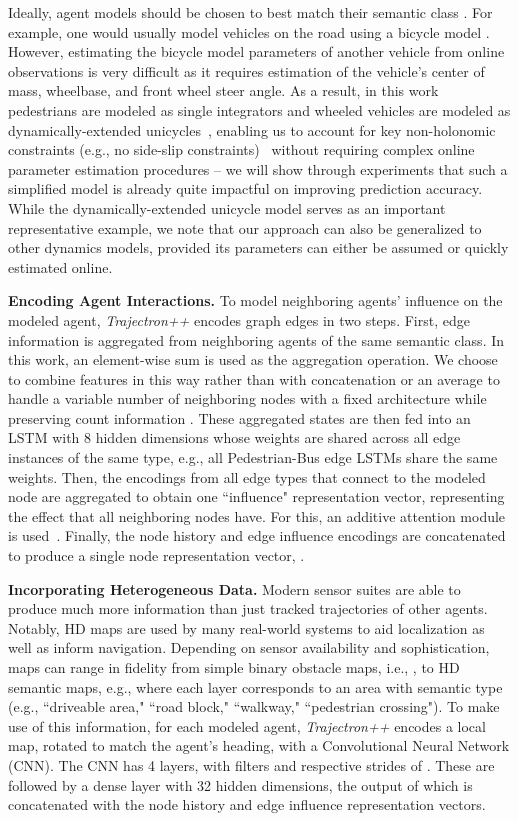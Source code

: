 \documentclass[runningheads]{llncs}
\newcommand{\algname}{\mbox{Trajectron++}}
\newcommand{\emphalgname}{\emph{\algname}}
\begin{document}
Ideally, agent models should be chosen to best match their semantic class . For example, one would usually model vehicles on the road using a bicycle model \cite{KongPfeiferEtAl2015,PadenCapEtAl2016}. However, estimating the bicycle model parameters of another vehicle from online observations is very difficult as it requires estimation of the vehicle's center of mass, wheelbase, and front wheel steer angle. As a result, in this work pedestrians are modeled as single integrators and wheeled vehicles are modeled as dynamically-extended unicycles~\cite{LaValle2006BetterUnicycle}, enabling us to account for key non-holonomic constraints (e.g., no side-slip constraints)~\cite{PadenCapEtAl2016} without requiring complex online parameter estimation procedures -- we will show through experiments that such a simplified model is already quite impactful on improving prediction accuracy.
While the dynamically-extended unicycle model serves as an important representative example, we note that our approach can also be generalized to other dynamics models, provided its parameters can either be assumed or quickly estimated online.


{\bf Encoding Agent Interactions.} To model neighboring agents' influence on the modeled agent, \emphalgname{} encodes graph edges in two steps. First, edge information is aggregated from neighboring agents of the same semantic class. In this work, an element-wise sum is used as the aggregation operation. We choose to combine features in this way rather than with concatenation or an average to handle a variable number of neighboring nodes with a fixed architecture while preserving count information \cite{BattagliaPascanuEtAl2016,IvanovicSchmerlingEtAl2018,JainZamirEtAl2016}. These aggregated states are then fed into an LSTM with 8 hidden dimensions whose weights are shared across all edge instances of the same type, e.g., all Pedestrian-Bus edge LSTMs share the same weights. Then, the encodings from all edge types that connect to the modeled node are aggregated to obtain one ``influence" representation vector, representing the effect that all neighboring nodes have. For this, an additive attention module is used~\cite{BahdanauChoEtAl2015}. Finally, the node history and edge influence encodings are concatenated to produce a single node representation vector, . 

{\bf Incorporating Heterogeneous Data.} Modern sensor suites are able to produce much more information than just tracked trajectories of other agents. Notably, HD maps are used by many real-world systems to aid localization as well as inform navigation. Depending on sensor availability and sophistication, maps can range in fidelity from simple binary obstacle maps, i.e., , to HD semantic maps, e.g.,  where each layer  corresponds to an area with semantic type (e.g., ``driveable area," ``road block," ``walkway," ``pedestrian crossing"). To make use of this information, for each modeled agent, \emphalgname{} encodes a local map, rotated to match the agent's heading, with a Convolutional Neural Network (CNN).
The CNN has 4 layers, with filters  and respective strides of . These are followed by a dense layer with 32 hidden dimensions, the output of which is concatenated with the node history and edge influence representation vectors.
\end{document}
